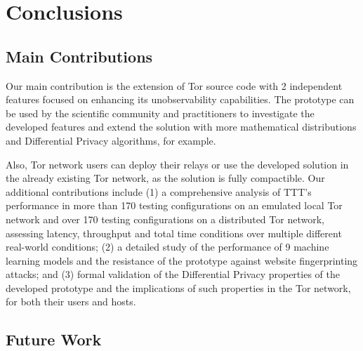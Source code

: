 
%

\chapter{Conclusions}\label{cha:conclusions}

\section{Main Contributions}\label{sec:main_conclusions}

Our main contribution is the extension of Tor source code with 2 independent features focused on enhancing its unobservability capabilities. The prototype can be used by the scientific community and practitioners to investigate the developed features and extend the solution with more mathematical distributions and Differential Privacy algorithms, for example. 

Also, Tor network users can deploy their relays or use the developed solution in the already existing Tor network, as the solution is fully compactible. Our additional contributions include  (1) a comprehensive analysis of TTT's performance in more than 170 testing configurations on an emulated local Tor network and over 170 testing configurations on a distributed Tor network, assessing latency, throughput and total time conditions over multiple different real-world conditions; (2) a detailed study of the performance of 9 machine learning models and the resistance of the prototype against website fingerprinting attacks; and (3) formal validation of the Differential Privacy properties of the developed prototype and the implications of such properties in the Tor network, for both their users and hosts.

\section{Future Work}\label{sec:future_work}

